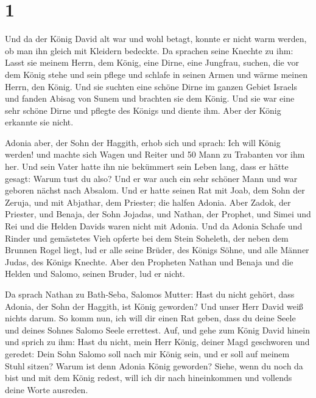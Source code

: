 \hypertarget{section}{%
\section{1}\label{section}}

 Und da der König David alt war und wohl betagt, konnte er
nicht warm werden, ob man ihn gleich mit Kleidern bedeckte.
 Da sprachen seine Knechte zu ihm: Lasst sie meinem Herrn,
dem König, eine Dirne, eine Jungfrau, suchen, die vor dem König stehe
und sein pflege und schlafe in seinen Armen und wärme meinen Herrn, den
König.  Und sie suchten eine schöne Dirne im ganzen Gebiet
Israels und fanden Abisag von Sunem und brachten sie dem König.
 Und sie war eine sehr schöne Dirne und pflegte des Königs
und diente ihm. Aber der König erkannte sie nicht.

 Adonia aber, der Sohn der Haggith, erhob sich und sprach:
Ich will König werden! und machte sich Wagen und Reiter und 50 Mann zu
Trabanten vor ihm her.  Und sein Vater hatte ihn nie
bekümmert sein Leben lang, dass er hätte gesagt: Warum tust du also? Und
er war auch ein sehr schöner Mann und war geboren nächst nach Absalom.
 Und er hatte seinen Rat mit Joab, dem Sohn der Zeruja,
und mit Abjathar, dem Priester; die halfen Adonia.  Aber
Zadok, der Priester, und Benaja, der Sohn Jojadas, und Nathan, der
Prophet, und Simei und Rei und die Helden Davids waren nicht mit Adonia.
 Und da Adonia Schafe und Rinder und gemästetes Vieh
opferte bei dem Stein Soheleth, der neben dem Brunnen Rogel liegt, lud
er alle seine Brüder, des Königs Söhne, und alle Männer Judas, des
Königs Knechte.  Aber den Propheten Nathan und Benaja und
die Helden und Salomo, seinen Bruder, lud er nicht.

 Da sprach Nathan zu Bath-Seba, Salomos Mutter: Hast du
nicht gehört, dass Adonia, der Sohn der Haggith, ist König geworden? Und
unser Herr David weiß nichts darum.  So komm nun, ich
will dir einen Rat geben, dass du deine Seele und deines Sohnes Salomo
Seele errettest.  Auf, und gehe zum König David hinein
und sprich zu ihm: Hast du nicht, mein Herr König, deiner Magd
geschworen und geredet: Dein Sohn Salomo soll nach mir König sein, und
er soll auf meinem Stuhl sitzen? Warum ist denn Adonia König geworden?
 Siehe, wenn du noch da bist und mit dem König redest,
will ich dir nach hineinkommen und vollends deine Worte ausreden.

